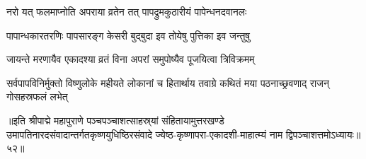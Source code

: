 \twolineshloka
{नरो यत् फलमाप्नोति अपराया व्रतेन तत्}
{पापद्रुमकुठारीयं पापेन्धनदवानलः}%

\twolineshloka
{पापान्धकारतरणिः पापसारङ्ग केसरी}
{बुद्बुदा इव तोयेषु पुत्तिका इव जन्तुषु}%

\twolineshloka
{जायन्ते मरणायैव एकादश्या व्रतं विना}
{अपरां समुपोष्यैव पूजयित्वा त्रिविक्रमम्}%

\threelineshloka
{सर्वपापविनिर्मुक्तो विष्णुलोके महीयते}
{लोकानां च हितार्थाय तवाग्रे कथितं मया}
{पठनाच्छ्रवणाद् राजन् गोसहस्रफलं लभेत्}%

॥इति श्रीपाद्मे महापुराणे पञ्चपञ्चाशत्साहस्र्यां संहितायामुत्तरखण्डे उमापतिनारदसंवादान्तर्गतकृष्णयुधिष्ठिरसंवादे ज्येष्ठ-कृष्णापरा-एकादशी-माहात्म्यं नाम द्विपञ्चाशत्तमोऽध्यायः॥५२॥

\genMangalaShloka

\hyperref[sec:ekadashi_mahatmyam_padma_puranam]{\closesub}
\clearpage

